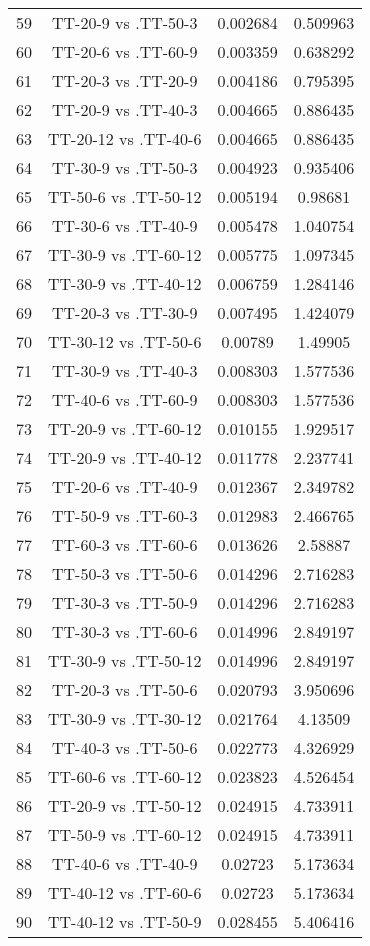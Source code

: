 \documentclass[a4paper,10pt]{article}
\begin{document}
\begin{landscape}
\begin{table}[!htp]
\begin{tabular}{cccc}
59&TT-20-9 vs .TT-50-3&0.002684&0.509963\\
60&TT-20-6 vs .TT-60-9&0.003359&0.638292\\
61&TT-20-3 vs .TT-20-9&0.004186&0.795395\\
62&TT-20-9 vs .TT-40-3&0.004665&0.886435\\
63&TT-20-12 vs .TT-40-6&0.004665&0.886435\\
64&TT-30-9 vs .TT-50-3&0.004923&0.935406\\
65&TT-50-6 vs .TT-50-12&0.005194&0.98681\\
66&TT-30-6 vs .TT-40-9&0.005478&1.040754\\
67&TT-30-9 vs .TT-60-12&0.005775&1.097345\\
68&TT-30-9 vs .TT-40-12&0.006759&1.284146\\
69&TT-20-3 vs .TT-30-9&0.007495&1.424079\\
70&TT-30-12 vs .TT-50-6&0.00789&1.49905\\
71&TT-30-9 vs .TT-40-3&0.008303&1.577536\\
72&TT-40-6 vs .TT-60-9&0.008303&1.577536\\
73&TT-20-9 vs .TT-60-12&0.010155&1.929517\\
74&TT-20-9 vs .TT-40-12&0.011778&2.237741\\
75&TT-20-6 vs .TT-40-9&0.012367&2.349782\\
76&TT-50-9 vs .TT-60-3&0.012983&2.466765\\
77&TT-60-3 vs .TT-60-6&0.013626&2.58887\\
78&TT-50-3 vs .TT-50-6&0.014296&2.716283\\
79&TT-30-3 vs .TT-50-9&0.014296&2.716283\\
80&TT-30-3 vs .TT-60-6&0.014996&2.849197\\
81&TT-30-9 vs .TT-50-12&0.014996&2.849197\\
82&TT-20-3 vs .TT-50-6&0.020793&3.950696\\
83&TT-30-9 vs .TT-30-12&0.021764&4.13509\\
84&TT-40-3 vs .TT-50-6&0.022773&4.326929\\
85&TT-60-6 vs .TT-60-12&0.023823&4.526454\\
86&TT-20-9 vs .TT-50-12&0.024915&4.733911\\
87&TT-50-9 vs .TT-60-12&0.024915&4.733911\\
88&TT-40-6 vs .TT-40-9&0.02723&5.173634\\
89&TT-40-12 vs .TT-60-6&0.02723&5.173634\\
90&TT-40-12 vs .TT-50-9&0.028455&5.406416\\

\end{tabular}
\end{table}
\end{landscape}
\end{document}

